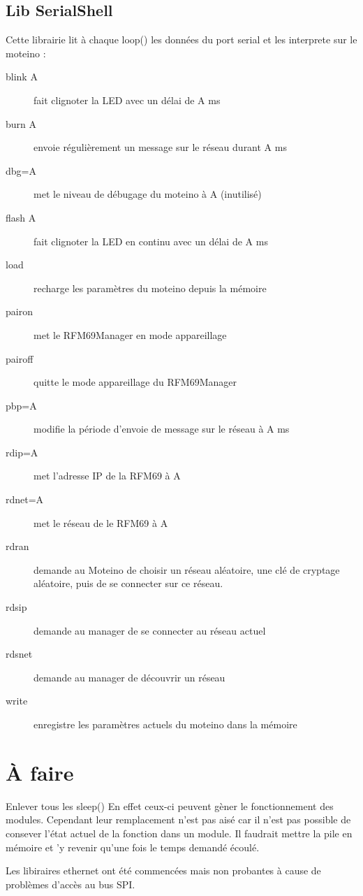 \documentclass[a4paper]{report}
\begin{document}
\subsection{Lib SerialShell}

Cette librairie lit à chaque loop() les données du port serial et les interprete sur le moteino :
\begin{description}
\item[blink A] fait clignoter la LED avec un délai de A ms
\item[burn A] envoie régulièrement un message sur le réseau durant A ms
\item[dbg=A] met le niveau de débugage du moteino à A (inutilisé)
\item[flash A] fait clignoter la LED en continu avec un délai de A ms
\item[load] recharge les paramètres du moteino depuis la mémoire
\item[pairon] met le RFM69Manager en mode appareillage
\item[pairoff] quitte le mode appareillage du RFM69Manager
\item[pbp=A] modifie la période d'envoie de message sur le réseau à A ms
\item[rdip=A] met l'adresse IP de la RFM69 à A
\item[rdnet=A] met le réseau de le RFM69 à A
\item[rdran] demande au Moteino de choisir un réseau aléatoire, une clé de cryptage aléatoire, puis de se connecter sur ce réseau.
\item[rdsip] demande au manager de se connecter au réseau actuel
\item[rdsnet] demande au manager de découvrir un réseau
\item[write] enregistre les paramètres actuels du moteino dans la mémoire
\end{description}

\section{À faire}

Enlever tous les sleep() En effet ceux-ci peuvent gèner le fonctionnement des modules. Cependant leur remplacement n'est pas aisé car il n'est pas possible de consever l'état actuel de la fonction dans un module. Il faudrait mettre la pile en mémoire et 'y revenir qu'une fois le temps demandé écoulé.

Les libiraires ethernet ont été commencées mais non probantes à cause de problèmes d'accès au bus SPI.
\end{document}
